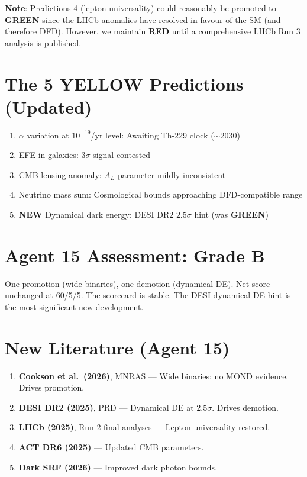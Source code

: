 \documentclass[11pt,a4paper]{article}
\newcommand{\GREEN}{\textcolor{dfdgreen}{\textbf{GREEN}}}
\newcommand{\RED}{\textcolor{dfdred}{\textbf{RED}}}
\newcommand{\NEW}{\textcolor{dfdblue}{\textbf{NEW}}}
\begin{document}
\textbf{Note}: Predictions 4 (lepton universality) could reasonably be promoted to \GREEN{} since the LHCb anomalies have resolved in favour of the SM (and therefore DFD). However, we maintain \RED{} until a comprehensive LHCb Run 3 analysis is published.

\section{The 5 YELLOW Predictions (Updated)}

\begin{enumerate}
\item $\alpha$ variation at $10^{-19}$/yr level: Awaiting Th-229 clock ($\sim$2030)
\item EFE in galaxies: $3\sigma$ signal contested
\item CMB lensing anomaly: $A_L$ parameter mildly inconsistent
\item Neutrino mass sum: Cosmological bounds approaching DFD-compatible range
\item \NEW{} Dynamical dark energy: DESI DR2 $2.5\sigma$ hint (was \GREEN)
\end{enumerate}

\section{Agent 15 Assessment: Grade B}

One promotion (wide binaries), one demotion (dynamical DE). Net score unchanged at 60/5/5. The scorecard is stable. The DESI dynamical DE hint is the most significant new development.

\section{New Literature (Agent 15)}

\begin{enumerate}
\item \textbf{Cookson et al.\ (2026)}, MNRAS --- Wide binaries: no MOND evidence. Drives promotion.
\item \textbf{DESI DR2 (2025)}, PRD --- Dynamical DE at $2.5\sigma$. Drives demotion.
\item \textbf{LHCb (2025)}, Run 2 final analyses --- Lepton universality restored.
\item \textbf{ACT DR6 (2025)} --- Updated CMB parameters.
\item \textbf{Dark SRF (2026)} --- Improved dark photon bounds.
\end{enumerate}
\end{document}
